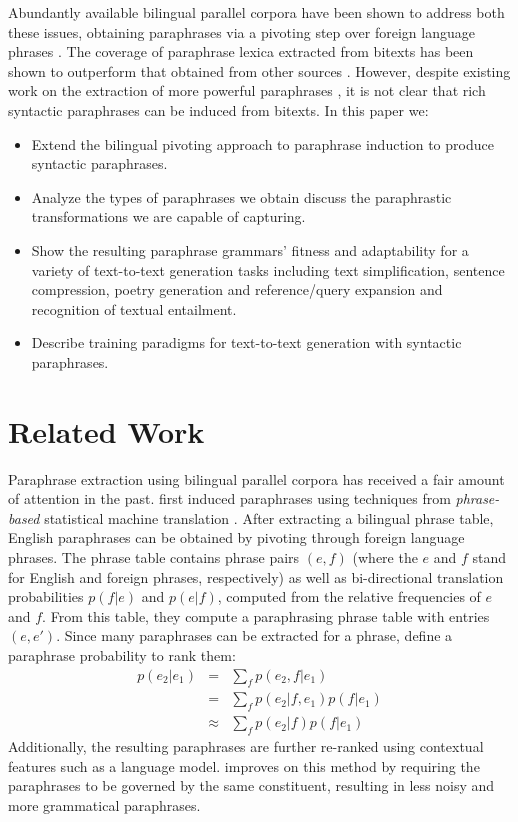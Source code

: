 \documentclass[11pt]{article}
\begin{document}
Abundantly available bilingual parallel corpora have been shown to
address both these issues, obtaining paraphrases via a pivoting step
over foreign language phrases \cite{Callison-Burch2005}. The coverage
of paraphrase lexica extracted from bitexts has been shown to
outperform that obtained from other sources \cite{Zhao2008b}. However,
despite existing work on the extraction of more powerful paraphrases
\cite{Madnani2007,Callison-Burch2008,Zhao2008}, it is not clear that
rich syntactic paraphrases can be induced from bitexts. In this paper
we:
\begin{itemize}
\item Extend the bilingual pivoting approach to paraphrase induction
  to produce syntactic paraphrases.
\item Analyze the types of paraphrases we obtain discuss the
  paraphrastic transformations we are capable of capturing.
\item Show the resulting paraphrase grammars' fitness and adaptability
  for a variety of text-to-text generation tasks including text
  simplification, sentence compression, poetry generation and
  reference/query expansion and recognition of textual entailment.
\item Describe training paradigms for text-to-text generation with
  syntactic paraphrases. 
\end{itemize}


\section{Related Work} \label{related_work}

Paraphrase extraction using bilingual parallel corpora has received a
fair amount of attention in the past. 
first induced paraphrases using techniques from {\it phrase-based}
statistical machine translation \cite{Koehn2003}. After extracting a
bilingual phrase table, English paraphrases can be obtained by
pivoting through foreign language phrases. The phrase table contains
phrase pairs $(e, f)$ (where the $e$ and $f$ stand for English and
foreign phrases, respectively) as well as bi-directional translation
probabilities $p(f | e)$ and $p(e | f)$, computed from the relative
frequencies of $e$ and $f$. From this table, they compute a
paraphrasing phrase table with entries $(e, e')$. Since many
paraphrases can be extracted for a phrase,
 define a paraphrase probability to rank
them:
\begin{eqnarray}
  p(e_2|e_1) &=& \sum_f p(e_2,f|e_1)\\
                  &=& \sum_f p(e_2|f,e_1) p(f|e_1) \\
                  &\approx& \sum_f p(e_2|f) p(f|e_1)
\label{paraphrase_prob_eqn}
\end{eqnarray}
Additionally, the resulting paraphrases are further re-ranked using
contextual features such as a language model.
 improves on this method by requiring the
paraphrases to be governed by the same constituent, resulting in less
noisy and more grammatical paraphrases.
\end{document}
